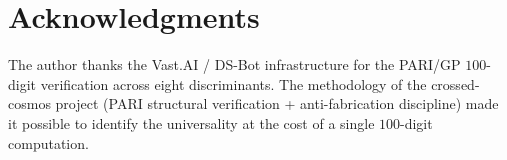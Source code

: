 \documentclass[11pt,a4paper,reqno]{amsart}
\theoremstyle{definition}
\begin{document}
\section{Acknowledgments}\label{sec:acks}

The author thanks the Vast.AI / DS-Bot infrastructure for the PARI/GP $100$-digit verification across eight discriminants. The methodology of the crossed-cosmos project (PARI structural verification + anti-fabrication discipline) made it possible to identify the universality at the cost of a single $100$-digit computation.



\end{document}
